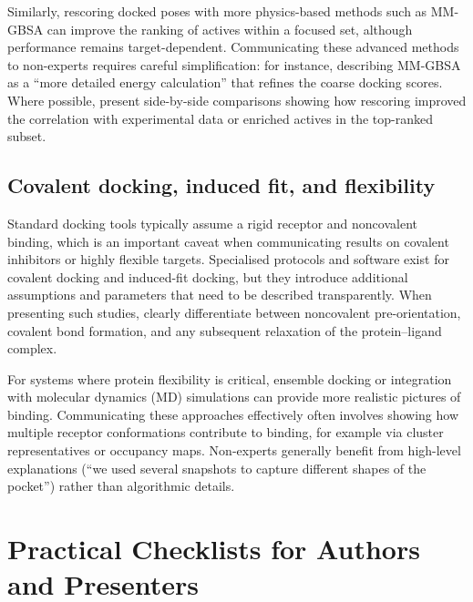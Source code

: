 \documentclass[12pt]{article}
\begin{document}
Similarly, rescoring docked poses with more physics-based methods such as MM-GBSA can improve the ranking of actives within a focused set, although performance remains target-dependent.\cite{CH11_EmpiricalScoring2018,CH11_Berry2015,CH11_cosconati2010} 
Communicating these advanced methods to non-experts requires careful simplification: for instance, describing MM-GBSA as a ``more detailed energy calculation'' that refines the coarse docking scores.\cite{CH11_Berry2015,CH11_EmpiricalScoring2018,CH11_BindingAffinity2018} 
Where possible, present side-by-side comparisons showing how rescoring improved the correlation with experimental data or enriched actives in the top-ranked subset.\cite{CH11_EmpiricalScoring2018,CH11_zhu2022,CH11_Forli2015} 

\subsection{Covalent docking, induced fit, and flexibility}

Standard docking tools typically assume a rigid receptor and noncovalent binding, which is an important caveat when communicating results on covalent inhibitors or highly flexible targets.\cite{CH11_Kitchen2004,CH11_AutoDock4,CH11_cosconati2010} 
Specialised protocols and software exist for covalent docking and induced-fit docking, but they introduce additional assumptions and parameters that need to be described transparently.\cite{CH11_AutoDock4,CH11_Glide2004,CH11_zhu2022} 
When presenting such studies, clearly differentiate between noncovalent pre-orientation, covalent bond formation, and any subsequent relaxation of the protein--ligand complex.\cite{CH11_AutoDock4,CH11_cosconati2010,CH11_Kitchen2004} 

For systems where protein flexibility is critical, ensemble docking or integration with molecular dynamics (MD) simulations can provide more realistic pictures of binding.\cite{CH11_Cheng2012,CH11_zhu2022,CH11_cosconati2010} 
Communicating these approaches effectively often involves showing how multiple receptor conformations contribute to binding, for example via cluster representatives or occupancy maps.\cite{CH11_Cheng2012,CH11_zhu2022,CH11_Forli2015} 
Non-experts generally benefit from high-level explanations (``we used several snapshots to capture different shapes of the pocket'') rather than algorithmic details.\cite{CH11_Berry2015,CH11_Cheng2012,CH11_zhu2022} 

\section{Practical Checklists for Authors and Presenters}
\end{document}
